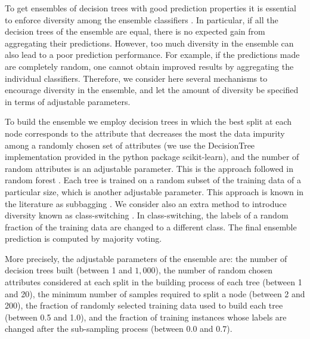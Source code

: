 \documentclass[review,preprint,12pt]{elsarticle}
\begin{document}
To get ensembles of decision trees with good prediction properties it is essential to enforce diversity among the 
ensemble classifiers \citep{dietterich2000ensemble}. In particular, if all the decision trees of the ensemble are 
equal, there is no expected gain from aggregating their predictions. However, too much diversity in the ensemble 
can also lead to a poor prediction performance. For example, if the predictions made are completely random, 
one cannot obtain improved results by aggregating the individual classifiers. Therefore, we consider 
here several mechanisms to encourage diversity in the ensemble, and let the amount of diversity be specified 
in terms of adjustable parameters.

To build the ensemble we employ decision trees in which the best split at each node corresponds
to the attribute that decreases the most the data impurity among a randomly chosen set 
of attributes (we use the DecisionTree implementation provided in the python package 
scikit-learn), and the number of random attributes is an adjustable parameter. 
This is the approach followed in random forest \citep{breiman2001random}. Each tree 
is trained on a random subset of the training data of a particular size, 
which is another adjustable parameter. This approach is known in the literature
as subbagging \citep{buhlmann2002analyzing}. We consider also an extra method to introduce 
diversity known as class-switching \citep{martinez2005switching}. In class-switching, the labels 
of a random fraction of the training data are changed to a different class. The final ensemble prediction 
is computed by majority voting.

More precisely, the adjustable parameters of the ensemble are: the number of decision trees built 
(between 1 and $1,000$), the number of random chosen attributes considered at each split in the building 
process of each tree (between 1 and 20), the minimum number of samples required to split a node (between 2 and
200), the fraction of randomly selected training data used to build each tree (between 0.5 and 1.0), 
and the fraction of training instances whose labels are changed after the sub-sampling process 
(between $0.0$ and $0.7$).
\end{document}
